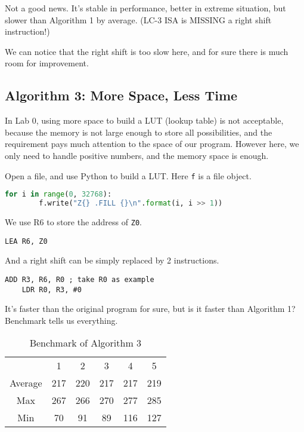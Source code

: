 \documentclass{article}
\begin{document}
	Not a good news. It's stable in performance, better in extreme situation, but slower than Algorithm 1 by average. (LC-3 ISA is MISSING a right shift instruction!)
	
	We can notice that the right shift is too slow here, and for sure there is much room for improvement.
	
	\subsection{Algorithm 3: More Space, Less Time}
	
	In Lab 0, using more space to build a LUT (lookup table) is not acceptable, because the memory is not large enough to store all possibilities, and the requirement pays much attention to the space of our program. However here, we only need to handle positive numbers, and the memory space is enough.
	
	Open a file, and use Python to build a LUT. Here \texttt{f} is a file object.
	
	\begin{lstlisting}[language=Python, caption={Building the LUT}]
	for i in range(0, 32768):
	    f.write("Z{} .FILL {}\n".format(i, i >> 1))
	\end{lstlisting}
	
	We use R6 to store the address of \texttt{Z0}.
	
	\begin{lstlisting}[caption={Algorithm 3: Part 1}]
	LEA R6, Z0
	\end{lstlisting}
	
	And a right shift can be simply replaced by 2 instructions.
	
	\begin{lstlisting}[caption={Algorithm 3: Part 2}]
	ADD R3, R6, R0 ; take R0 as example
	LDR R0, R3, #0
	\end{lstlisting}
	
	It's faster than the original program for sure, but is it faster than Algorithm 1? Benchmark tells us everything.
	
	\begin{table}[h]
		\centering
		\begin{tabular}{cccccc}
		        & 1    & 2    & 3    & 4    & 5    \\
		Average & 217 & 220 & 217 & 217 & 219 \\
		Max     & 267 & 266 & 270 & 277 & 285 \\
		Min     & 70  & 91  & 89  & 116 & 127 
		\end{tabular}
		\caption{Benchmark of Algorithm 3}
	\end{table}
	
\end{document}
